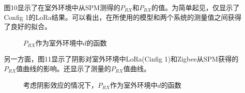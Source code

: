 \documentclass[10pt]{ctexart}
\begin{document}
图10显示了在室外环境中从SPM测得的$P_{RX}$和$P_{RX}$的值。为简单起见，仅显示了Config 1的LoRa结果。可以看出，在所使用的模型和两个系统的测量值之间获得了良好的拟合。

\begin{figure}[H]
  \renewcommand{\figurename}{图}
  \caption{$P_{R X}$作为室外环境中$d$的函数}
\end{figure}

另一方面，图11显示了阴影对室外环境中LoRa(Cinfig 1)和Zigbee从SPM获得的$P_{RX}$值曲线的影响。还显示了测量的$P_{R X}$值曲线。

\begin{figure}[H]
  \renewcommand{\figurename}{图}
  \caption{考虑阴影效应的情况下，$P_{RX}$作为室外环境中$d$的函数}
\end{figure}
\end{document}
